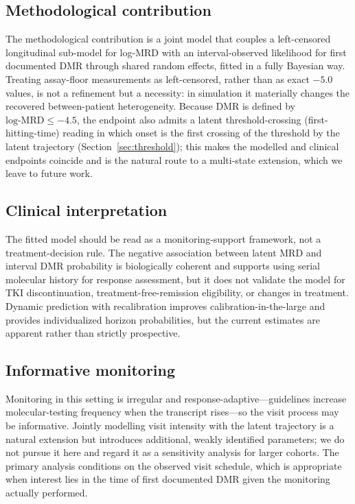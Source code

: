 \documentclass[11pt]{article}
\begin{document}
\subsection{Methodological contribution}

The methodological contribution is a joint model that couples a
left-censored longitudinal sub-model for log-MRD with an interval-observed
likelihood for first documented DMR through shared random effects, fitted in
a fully Bayesian way. Treating assay-floor measurements as left-censored,
rather than as exact $-5.0$ values, is not a refinement but a necessity: in
simulation it materially changes the recovered between-patient
heterogeneity. Because DMR is defined by $\text{log-MRD}\le-4.5$, the
endpoint also admits a latent threshold-crossing (first-hitting-time)
reading in which onset is the first crossing of the threshold by the latent
trajectory (Section~\ref{sec:threshold}); this makes the modelled and
clinical endpoints coincide and is the natural route to a multi-state
extension, which we leave to future work.

\subsection{Clinical interpretation}

The fitted model should be read as a monitoring-support framework, not a
treatment-decision rule. The negative association between latent MRD and
interval DMR probability is biologically coherent and supports using
serial molecular history for response assessment, but it does not validate
the model for TKI discontinuation, treatment-free-remission eligibility,
or changes in treatment. Dynamic prediction with recalibration improves
calibration-in-the-large and provides individualized horizon
probabilities, but the current estimates are apparent rather than strictly
prospective.

\subsection{Informative monitoring}

Monitoring in this setting is irregular and response-adaptive---guidelines
increase molecular-testing frequency when the transcript rises---so the
visit process may be informative. Jointly modelling visit intensity with the
latent trajectory is a natural extension but introduces additional, weakly
identified parameters; we do not pursue it here and regard it as a
sensitivity analysis for larger cohorts. The primary analysis conditions on
the observed visit schedule, which is appropriate when interest lies in the
time of first documented DMR given the monitoring actually performed.
\end{document}

